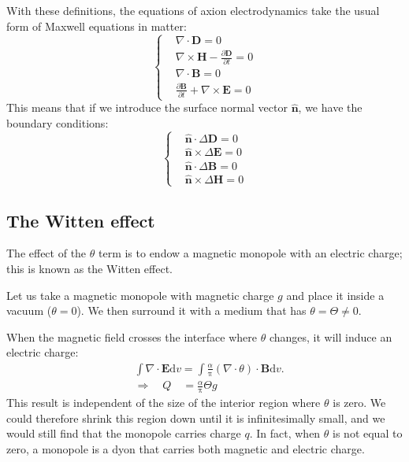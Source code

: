 With these definitions, the equations of axion electrodynamics take the usual form of Maxwell equations in matter:
\begin{equation}
\left\{
\begin{aligned}
&\nabla \cdot \bm{D} = 0 \\
&\nabla \times \bm{H} - \frac{\partial \bm{D}}{\partial t} = 0 \\
&\nabla \cdot \bm{B} = 0 \\
&\frac{\partial \bm{B}}{\partial t} + \nabla \times \bm{E} = 0
\end{aligned}
\right.
\end{equation}
This means that if we introduce the surface normal vector $\bm{\hat{n}}$, we have the boundary conditions:
\begin{equation}
\left\{
\begin{aligned}
&\bm{\hat{n}} \cdot \Delta \bm{D} = 0 \\
&\bm{\hat{n}} \times \Delta \bm{E} = 0 \\
&\bm{\hat{n}} \cdot \Delta \bm{B} = 0 \\
&\bm{\hat{n}} \times \Delta \bm{H} = 0
\end{aligned}
\right.
\end{equation}

\subsection{The Witten effect}

The effect of the $\theta$ term is to endow a magnetic monopole with an electric charge; this is known as the Witten effect.

Let us take a magnetic monopole with magnetic charge $g$ and place it inside a vacuum ($\theta=0$). We then surround it with a medium that has $\theta = \Theta \neq 0$.

When the magnetic field crosses the interface where $\theta$ changes, it will induce an electric charge:
\begin{equation}
\begin{aligned}
&\int \nabla \cdot \bm{E} \mathrm{d} v = \int \frac{\alpha}{\uppi} (\nabla \cdot \theta) \cdot \bm{B} \mathrm{d} v. \\
&\Rightarrow \quad Q \quad = \frac{\alpha}{\uppi} \Theta g
\end{aligned}
\end{equation}
This result is independent of the size of the interior region where $\theta$ is zero. We could therefore shrink this region down until it is infinitesimally small, and we would still find that the monopole carries charge $q$. In fact, when $\theta$ is not equal to zero, a monopole is a dyon that carries both magnetic and electric charge.

